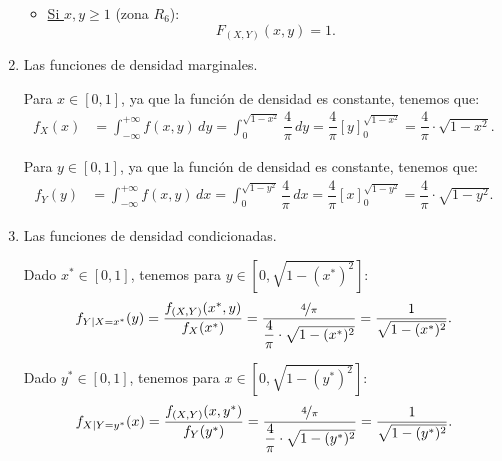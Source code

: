 \begin{ejercicio}
\begin{enumerate}
\begin{itemize}
            \item \ul{Si $x,y\geq 1$} (zona $R_6$):
            \begin{equation*}
                F_{(X,Y)}(x, y) = 1.
            \end{equation*}
        \end{itemize}


        \item Las funciones de densidad marginales.
        
        Para $x\in [0,1]$, ya que la función de densidad es constante, tenemos que:
        \begin{align*}
            f_X(x) &= \int_{-\infty}^{+\infty} f(x, y) \, dy = \int_{0}^{\sqrt{1-x^2}} \dfrac{4}{\pi} \, dy = \dfrac{4}{\pi}\left[y\right]_{0}^{\sqrt{1-x^2}} = \dfrac{4}{\pi}\cdot \sqrt{1-x^2}.
        \end{align*}

        Para $y\in [0,1]$, ya que la función de densidad es constante, tenemos que:
        \begin{align*}
            f_Y(y) &= \int_{-\infty}^{+\infty} f(x, y) \, dx = \int_{0}^{\sqrt{1-y^2}} \dfrac{4}{\pi} \, dx = \dfrac{4}{\pi}\left[x\right]_{0}^{\sqrt{1-y^2}} = \dfrac{4}{\pi}\cdot \sqrt{1-y^2}.
        \end{align*}
        \item Las funciones de densidad condicionadas.
        
        Dado $x^\ast\in [0,1]$, tenemos para $y\in [0,\sqrt{1-(x^{\ast})^2}]$:
        \begin{equation*}
            f_{Y\mid X=x^\ast} (y) = \dfrac{f_{(X,Y)}(x^\ast, y)}{f_X(x^\ast)} = \dfrac{\nicefrac{4}{\pi}}{\dfrac{4}{\pi}\cdot \sqrt{1-(x^{\ast})^2}} = \dfrac{1}{\sqrt{1-(x^{\ast})^2}}.
        \end{equation*}

        Dado $y^\ast\in [0,1]$, tenemos para $x\in [0,\sqrt{1-(y^{\ast})^2}]$:
        \begin{equation*}
            f_{X\mid Y=y^\ast} (x) = \dfrac{f_{(X,Y)}(x, y^\ast)}{f_Y(y^\ast)} = \dfrac{\nicefrac{4}{\pi}}{\dfrac{4}{\pi}\cdot \sqrt{1-(y^{\ast})^2}} = \dfrac{1}{\sqrt{1-(y^{\ast})^2}}.
        \end{equation*}
    \end{enumerate}
\end{ejercicio}
